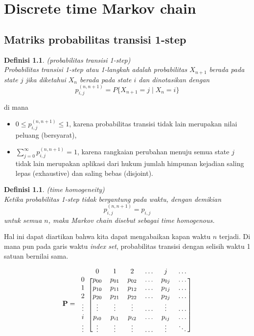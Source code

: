 \documentclass[11pt,b5paper,twoside]{book}
\newtheorem{definition}[theorem]{Definisi}
\begin{document}
\chapter{Discrete time Markov chain}

	\section{Matriks probabilitas transisi 1-step} %
	\begin{definition}(probabilitas transisi 1-step)\\
		Probabilitas transisi 1-step atau 1-langkah adalah probabilitas $X_{n+1}$ berada pada state $j$ jika diketahui $X_n$ berada pada state $i$ dan dinotasikan dengan 
		\begin{equation}
		p_{i,j}^{(n,n+1)}= P\{X_{n+1} = j \mid X_n=i\}
		\end{equation}
	\end{definition}
	di mana
	\begin{itemize}
		\item $0 \leq p_{i,j}^{(n,n+1)} \leq 1$, karena probabilitas transisi tidak lain merupakan nilai peluang (bersyarat),
		
		\item $\sum_{j=0}^{\infty}p_{i,j}^{(n,n+1)}=1$, karena rangkaian perubahan menuju semua state $j$ tidak lain merupakan aplikasi dari hukum jumlah himpunan kejadian saling lepas (exhaustive) dan saling bebas (disjoint).
	\end{itemize}

	\begin{definition} (time homogeneity)\\
		Ketika probabilitas 1-step tidak bergantung pada waktu, dengan demikian
		$$
		p_{i,j}^{(n,n+1)} =p_{i,j}
		$$
		untuk semua $n$, maka Markov chain disebut sebagai time homogenous.
	\end{definition}
	\noindent Hal ini dapat diartikan bahwa kita dapat mengabaikan kapan waktu $n$ terjadi. Di mana pun pada garis waktu \textit{index set}, probabilitas transisi dengan selisih waktu 1 satuan bernilai sama.
	
	\[
	\mathbf{P}= 
	\begin{blockarray}{l *{6}{c}}
	&0 & 1 & 2 & \dots & j & \dots \\
	\begin{block}{c[cccccc]}
	0& p_{00} & p_{01} & p_{02} & \dots & p_{0j} & \dots \\
	1& p_{10} & p_{11} & p_{12} & \dots & p_{1j} & \dots \\
	2 & p_{20} & p_{21} & p_{22} & \dots & p_{2j} & \dots \\
	\vdots & \vdots & \vdots & \vdots & \dots & \vdots &\dots \\
	i & p_{i0} & p_{i1} & p_{i2} & \dots & p_{ij} & \dots \\
	\vdots & \vdots & \vdots & \vdots & \dots & \vdots & \ddots\\
	\end{block}
	\end{blockarray}
	\]
		
\end{document}
